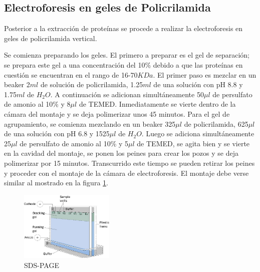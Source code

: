\documentclass[%
 reprint,
 amsmath,amssymb,
 aps,
showkeys
]{revtex4-1}
\begin{document}
	\subsection{\label{sec:ElectroMet}Electroforesis en geles de Policrilamida}		
		Posterior a la extracción de proteínas se procede a realizar la electroforesis en geles de policrilamida vertical. 
		
		Se comienza preparando los geles. El primero a preparar es el gel de separación; se prepara este gel a una concentración del 10\% debido a que las proteínas en cuestión se encuentran en el rango de 16-70$KDa$. El primer paso es mezclar en un beaker 2$ml$ de solución de policrilamida, 1.25$ml$ de una solución con pH 8.8 y 1.75$ml$ de $H_2O$. A continuación se adicionan simultáneamente 50$\mu l$ de persulfato de amonio al 10\% y 8$\mu l$ de TEMED. Inmediatamente se vierte dentro de la cámara del montaje y se deja polimerizar unos 45 minutos. Para el gel de agrupamiento, se comienza mezclando en un beaker 325$\mu l$ de policrilamida, 625$\mu l$ de una solución con pH 6.8 y 1525$\mu l$ de $H_2O$. Luego se adiciona simultáneamente 25$\mu l$ de persulfato de amonio al 10\% y 5$\mu l$ de TEMED, se agita bien y se vierte en la cavidad del montaje, se ponen los peines para crear los pozos y se deja polimerizar por 15 minutos. Transcurrido este tiempo se pueden retirar los peines y proceder con el montaje de la cámara de electroforesis. El montaje debe verse similar al mostrado en la figura \ref{Imagen: SDS-PAGE}.
		
		\begin{figure}[h]
		\includegraphics[width=0.4\textwidth]{SDS-PAGE.jpg}
		\caption{SDS-PAGE}
		\label{Imagen: SDS-PAGE}
		\end{figure} 
\end{document}
